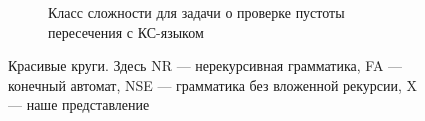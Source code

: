 \documentclass[10pt]{article}
\begin{document}
\begin{figure}[h!]
\begin{subfigure}[t]{0.45\textwidth}
			\caption{Класс сложности для задачи о проверке пустоты пересечения с КС-языком}
			\label{circle:intersec}
		\end{subfigure}
		\caption{Красивые круги. Здесь NR --- нерекурсивная грамматика, FA --- конечный автомат, NSE --- грамматика без вложенной рекурсии, X --- наше представление}
		\label{circle}
	\end{figure}
	
	
	
	
\end{document}

